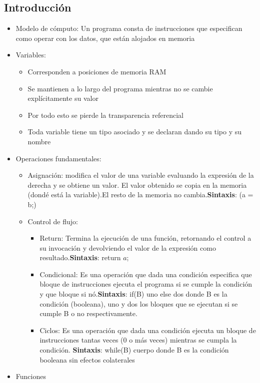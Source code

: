\documentclass[a4paper,10pt]{article}
\begin{document}
\subsection{Introducción}
    \begin{itemize}
    	\item Modelo de cómputo: Un programa consta de instrucciones que especifican como operar con los datos, que están alojados en memoria
	\item Variables:
	\begin{itemize}
	    \item Corresponden a posiciones de memoria RAM
	    \item Se mantienen a lo largo del programa mientras no se cambie explícitamente su valor
	    \item Por todo esto se pierde la transparencia referencial
	    \item Toda variable tiene un tipo asociado y se declaran dando su tipo y su nombre
	\end{itemize} 
	\item Operaciones fundamentales:
	\begin{itemize}
	    \item Asignación: modifica el valor de una variable evaluando la expresión de la derecha y se obtiene un valor. El valor obtenido se copia en la memoria (dondé está la variable).El resto de la memoria no cambia.\textbf{Sintaxis}: (a = b;)
	    \item Control de flujo: 
	    \begin{itemize}
		\item Return: Termina la ejecución de una función, retornando el control a su invocación y devolviendo el valor de la expresión como resultado.\textbf{Sintaxis}: return $a$;
		\item Condicional: Es una operación que dada una condición especifica que bloque de instrucciones ejecuta el programa si se cumple la condición y que bloque si nó.\textbf{Sintaxis}: if(B) uno else dos
		\subitem donde B es la condición (booleana), uno y dos los bloques que se ejecutan si se cumple B o no respectivamente.
		\item Ciclos: Es una operación que dada una condición ejecuta un bloque de instrucciones tantas veces (0 o más veces) mientras se cumpla la condición. \textbf{Sintaxis}: while(B) cuerpo
		\subitem donde B es la condición booleana sin efectos colaterales
	    \end{itemize}
	\end{itemize}
	\item Funciones

\end{itemize}
\end{document}
